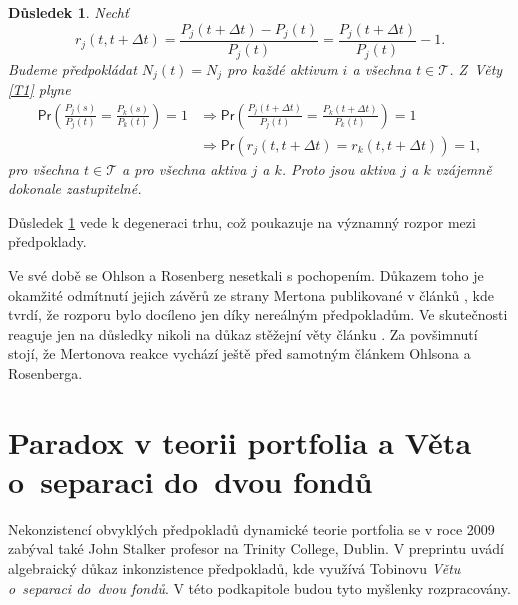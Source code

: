 \documentclass[a4paper,12pt]{report}
\newtheorem{dusledek}[veta]{Důsledek}
\theoremstyle{definition} \newtheorem{definice}[veta]{Definice}
\theoremstyle{remark}
\begin{document}
\begin{dusledek}\label{OR_dusledek}
Nechť 
$$r_j(t,t+\Delta t)=\frac{P_j(t+\Delta t)-P_j(t)}{P_j(t)}=\frac{P_j(t+\Delta t)}{P_j(t)}-1.$$
Budeme předpokládat $N_j(t)=N_j$ pro každé aktivum $i$ a všechna $t\in \mathcal{T}$. 
Z~Věty \ref{T1} plyne
\begin{align*}
\mathsf{Pr}\left(\frac{P_j(s)}{P_j(t)}=\frac{P_k(s)}{P_k(t)}\right)=1&\Longrightarrow\mathsf{Pr}\left(\frac{P_j(t+\Delta t)}{P_j(t)}=\frac{P_k(t+\Delta t)}{P_k(t)}\right)=1 \\
&\Longrightarrow\mathsf{Pr}\left(r_j(t,t+\Delta t)=r_k(t,t+\Delta t)\right)=1,
\end{align*}
pro všechna $t\in \mathcal{T}$ a pro všechna aktiva $j$ a $k$.
Proto jsou aktiva $j$ a $k$ vzájemně dokonale zastupitelné.
\end{dusledek}
Důsledek \ref{OR_dusledek} vede k degeneraci trhu, což poukazuje na významný rozpor mezi předpoklady.

Ve své době se Ohlson a Rosenberg nesetkali s pochopením.
Důkazem toho je okamžité odmítnutí jejich závěrů ze strany Mertona publikované v článků \cite{merton1975}, kde tvrdí, že rozporu bylo docíleno jen díky nereálným předpokladům. 
Ve skutečnosti reaguje jen na důsledky nikoli na důkaz stěžejní věty článku \cite{ohlson}.  
Za povšimnutí stojí, že Mertonova reakce vychází ještě před samotným článkem Ohlsona a Rosenberga.



\section{Paradox v teorii portfolia a Věta o~separaci do~dvou fondů} \label{john}
Nekonzistencí obvyklých předpokladů dynamické teorie portfolia se v roce 2009 zabýval také John Stalker profesor na Trinity College, Dublin. 
V preprintu \cite{john} uvádí algebraický důkaz inkonzistence předpokladů, kde využívá Tobinovu \textit{Větu o~separaci do~dvou fondů}. 
V této podkapitole budou tyto myšlenky rozpracovány.
\end{document}
